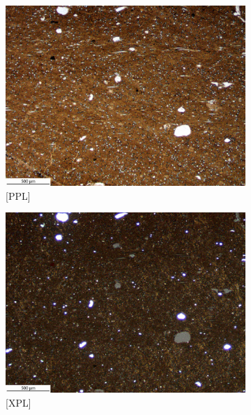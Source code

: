 \documentclass[a4paper]{article}
\begin{document}
\begin{figure}[H]
	\centering
	\begin{subfigure}[t]{.49\textwidth}
		\includegraphics[width=\textwidth]{ThinSections/47-1_4x_PPL.jpg}
		\caption{[PPL]}
	\end{subfigure}\hspace{.5em}\hfill
	\begin{subfigure}[t]{.49\textwidth}
		\includegraphics[width=\textwidth]{ThinSections/47-1_4x_XPL.jpg}
		\caption{[XPL]}
	\end{subfigure}
	\begin{subfigure}[t]{.49\textwidth}

\end{subfigure}
\end{figure}
\end{document}
